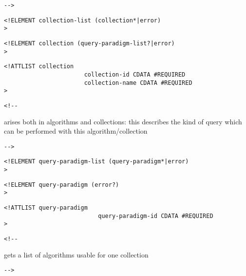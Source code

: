         
 \begin{verbatim}-->\end{verbatim}



\begin{verbatim}
<!ELEMENT collection-list (collection*|error) 
>\end{verbatim}

\begin{verbatim}
<!ELEMENT collection (query-paradigm-list?|error) 
>\end{verbatim}

\begin{verbatim}
<!ATTLIST collection 
                       collection-id CDATA #REQUIRED
                       collection-name CDATA #REQUIRED
>\end{verbatim}

\begin{verbatim}<!--\end{verbatim}
  

     arises both in algorithms and collections:
     this describes the kind of query which can
     be performed with this algorithm/collection 

       
 \begin{verbatim}-->\end{verbatim}



\begin{verbatim}
<!ELEMENT query-paradigm-list (query-paradigm*|error) 
>\end{verbatim}

\begin{verbatim}
<!ELEMENT query-paradigm (error?) 
>\end{verbatim}

\begin{verbatim}
<!ATTLIST query-paradigm 
                           query-paradigm-id CDATA #REQUIRED
>\end{verbatim}

\begin{verbatim}<!--\end{verbatim}
  


     gets a list of algorithms usable for one collection  

       
 \begin{verbatim}-->\end{verbatim}



